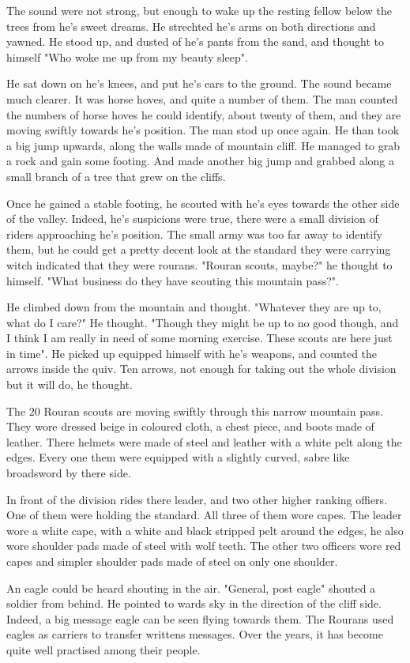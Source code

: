 The sound were not strong, but enough to wake up the resting fellow below the trees from he's sweet dreams. He strechted he's arms on both directions and yawned. He stood up, and dusted of he's pants from the sand, and thought to himself "Who woke me up from my beauty sleep".

He sat down on he's knees, and put he's ears to the ground. The sound became much clearer. It was horse hoves, and quite a number of them. The man counted the numbers of horse hoves he could identify, about twenty of them, and they are moving swiftly towards he's position. The man stod up once again. He than took a big jump upwards, along the walls made of mountain cliff. He managed to grab a rock and gain some footing. And made another big jump and grabbed along a small branch of a tree that grew on the cliffs.

Once he gained a stable footing, he scouted with he's eyes towards the other side of the valley. Indeed, he's suspicions were true, there were a small division of riders approaching he's position. The small army was too far away to identify them, but he could get a pretty decent look at the standard they were carrying witch indicated that they were rourans. "Rouran scouts, maybe?" he thought to himself. "What business do they have scouting this mountain pass?".

He climbed down from the mountain and thought. "Whatever they are up to, what do I care?" He thought. "Though they might be up to no good though, and I think I am really in need of some morning exercise. These scouts are here just in time". He picked up equipped himself with he's weapons, and counted the arrows inside the quiv. Ten arrows, not enough for taking out the whole division but it will do, he thought.

\newsect

The 20 Rouran scouts are moving swiftly through this narrow mountain pass. They wore dressed beige in coloured cloth, a chest piece, and boots made of leather. There helmets were made of steel and leather with a white pelt along the edges. Every one them were equipped with a slightly curved, sabre like broadsword by there side.

In front of the division rides there leader, and two other higher ranking offiers. One of them were holding the standard. All three of them wore capes. The leader wore a white cape, with a white and black stripped pelt around the edges, he also wore shoulder pads made of steel with wolf teeth. The other two officers wore red capes and simpler shoulder pads made of steel on only one shoulder.

An eagle could be heard shouting in the air.
"General, post eagle" shouted a soldier from behind. He pointed to wards sky in the direction of the cliff side. Indeed, a big message eagle can be seen flying towards them. The Rourans used eagles as carriers to transfer writtens messages. Over the years, it has become quite well practised among their people.

